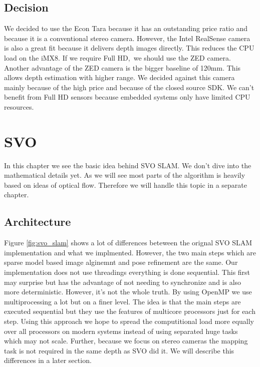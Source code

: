 \documentclass[11pt,a4paper,titlepage,oneside]{report}
\begin{document}
\section{Decision}

We decided to use the Econ Tara because it has an outstanding price ratio and because it is a conventional stereo camera. However, the Intel RealSense camera is also a great fit because it delivers depth images directly. This reduces the CPU load on the iMX8. If we require Full HD, we should use the ZED camera. Another advantage of the ZED camera is the bigger baseline of 120mm. This allows depth estimation with higher range. We decided against this camera mainly because of the high price and because of the closed source SDK. We can't benefit from Full HD sensors because embedded systems only have limited CPU resources.

\chapter{SVO}
In this chapter we see the basic idea behind SVO SLAM. We don't dive into the mathematical details yet. As we will see most parts of the algorithm is heavily based on ideas of optical flow. Therefore we will handle this topic in a separate chapter.

\section{Architecture}

Figure \ref{fig:svo_slam} shows a lot of differences beteween the orignal SVO SLAM implementation and what we implmented. However, the two main steps which are sparse model based image alginemnt and pose refinement are the same. Our implementation does not use threadings everything is done sequential. This first may surprise but has the advantage of not needing to synchronize and is also more deterministic. However, it's not the whole truth. By using OpenMP we use multiprocessing a lot but on a finer level. The idea is that the main steps are executed sequential but they use the features of multicore processors just for each step. Using this approach we hope to spread the computitional load more equally over all processors on modern systems instead of using separated huge tasks which may not scale. Further, because we focus on stereo cameras the mapping task is not required in the same depth as SVO did it. We will describe this differences in a later section.
\end{document}
